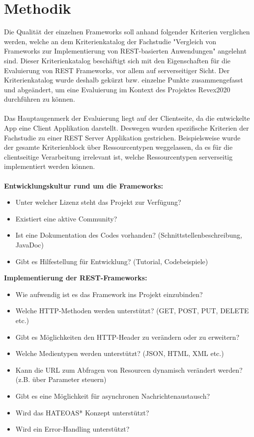 \section{Methodik}
\label{sec:methodik}
Die Qualität der einzelnen Frameworks soll anhand folgender Kriterien verglichen werden, welche an dem Kriterienkatalog der Fachstudie "Vergleich von Frameworks zur Implementierung von REST-basierten Anwendungen" \cite{vergleich13} angelehnt sind. Dieser Kriterienkatalog beschäftigt sich mit den Eigenschaften für die Evaluierung von REST Frameworks, vor allem auf serverseitiger Sicht. Der Kriterienkatalog wurde deshalb gekürzt bzw. einzelne Punkte zusammengefasst und abgeändert, um eine Evaluierung im Kontext des Projektes Revex2020 durchführen zu können. 
\\\\
Das Hauptaugenmerk der Evaluierung liegt auf der Clientseite, da die entwickelte App eine Client Applikation darstellt. Deswegen wurden spezifische Kriterien der Fachstudie zu einer REST Server Applikation gestrichen. Beispielsweise wurde der gesamte Kriterienblock über Ressourcentypen \cite{ressourcen:rest} weggelassen, da es für die clientseitige Verarbeitung irrelevant ist, welche Ressourcentypen serverseitig implementiert werden können. 
\\\\
\textbf{Entwicklungskultur rund um die Frameworks:}
\begin{itemize}
	\item Unter welcher Lizenz steht das Projekt zur Verfügung?
	\item Existiert eine aktive Community?
	\item Ist eine Dokumentation des Codes vorhanden? (Schnittstellenbeschreibung, JavaDoc)	
	\item Gibt es Hilfestellung für Entwicklung? (Tutorial, Codebeispiele)
\end{itemize}

\textbf{Implementierung der REST-Frameworks:}
\begin{itemize}
	\item Wie aufwendig ist es das Framework ins Projekt einzubinden? 
	\item Welche \acrfull{HTTP}-Methoden werden unterstützt? (GET, POST, PUT, DELETE etc.)
	\item Gibt es Möglichkeiten den HTTP-Header zu verändern oder zu erweitern?
	\item Welche Medientypen werden unterstützt? (JSON, HTML, XML etc.)
	\item Kann die URL zum Abfragen von Resourcen dynamisch verändert werden? (z.B. über Parameter steuern)
	\item Gibt es eine Möglichkeit für asynchronen Nachrichtenaustausch?
	\item Wird das \acrfull{HATEOAS}* Konzept unterstützt?
	\item Wird ein Error-Handling unterstützt?	
\end{itemize}

